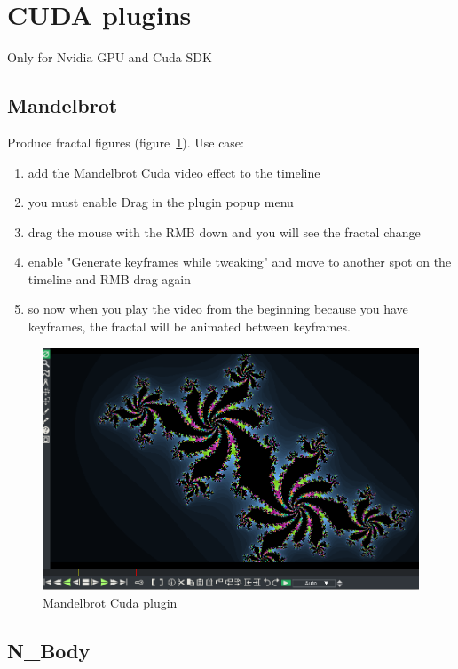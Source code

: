 {\section{CUDA plugins}%
\label{sec:cuda_plugins}

Only for Nvidia GPU and Cuda SDK

\subsection{Mandelbrot}%
\label{sub:mandelbrot}

Produce fractal figures (figure~\ref{fig:mandelbrot}). Use case:
\begin{enumerate}
	\item add the Mandelbrot Cuda video effect to the timeline
	\item you must enable Drag in the plugin popup menu
	\item drag the mouse with the RMB down and you will see the fractal change
	\item enable "Generate keyframes while tweaking" and move to another spot on the timeline and RMB drag again
	\item so now when you play the video from the beginning because you have keyframes, the fractal will be animated between keyframes.
\end{enumerate}

\begin{figure}[hbtp]
	\centering
	\includegraphics[width=0.9\linewidth]{images/mandelbrot.png}
	\caption{Mandelbrot Cuda plugin}
	\label{fig:mandelbrot}
\end{figure}

\subsection{N\_Body}%
\label{sub:n_body}

}
